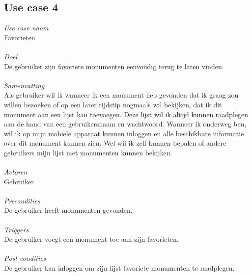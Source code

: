 \documentclass[a4paper,10pt]{article}
\begin{document}
		\subsection{Use case 4}
			\textit{Use case naam}\\
			Favorieten\\ \\
			\textit{Doel}\\
			De gebruiker zijn favoriete monumenten eenvoudig terug te laten vinden.\\ \\
			\textit{Samenvatting}\\
			Als gebruiker wil ik wanneer ik een monument heb gevonden dat ik graag zou willen bezoeken of op een later tijdstip nogmaals wil bekijken, dat ik dit monument aan een lijst kan toevoegen. Deze lijst wil ik altijd kunnen raadplegen aan de hand van een gebruikersnaam en wachtwoord. Wanneer ik onderweg ben, wil ik op mijn mobiele apparaat kunnen inloggen en alle beschikbare informatie over dit monument kunnen zien. Wel wil ik zelf kunnen bepalen of andere gebruikers mijn lijst met monumenten kunnen bekijken.\\ \\
			\textit{Actoren}\\
			Gebruiker\\ \\
			\textit{Precondities}\\
			De gebruiker heeft monumenten gevonden.\\ \\
			\textit{Triggers}\\
			De gebruiker voegt een monument toe aan zijn favorieten.\\ \\
			\textit{Post condities}\\
			De gebruiker kan inloggen om zijn lijst favoriete monumenten te raadplegen.
		
\end{document}
